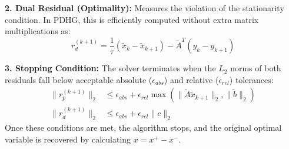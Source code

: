 \documentclass{article}
\begin{document}
\textbf{2. Dual Residual (Optimality):} Measures the violation of the stationarity condition. In PDHG, this is efficiently computed without extra matrix multiplications as:
\begin{equation}
    r_d^{(k+1)} = \frac{1}{\tau}(\tilde{x}_k - \tilde{x}_{k+1}) - \tilde{A}^T(y_k - y_{k+1})
\end{equation}

\textbf{3. Stopping Condition:} The solver terminates when the $L_2$ norms of both residuals fall below acceptable absolute ($\epsilon_{abs}$) and relative ($\epsilon_{rel}$) tolerances:
\begin{align}
    \|r_p^{(k+1)}\|_2 &\le \epsilon_{abs} + \epsilon_{rel} \max(\|\tilde{A}\tilde{x}_{k+1}\|_2, \|\tilde{b}\|_2) \\
    \|r_d^{(k+1)}\|_2 &\le \epsilon_{abs} + \epsilon_{rel} \|c\|_2
\end{align}
Once these conditions are met, the algorithm stops, and the original optimal variable is recovered by calculating $x = x^+ - x^-$.
\end{document}
